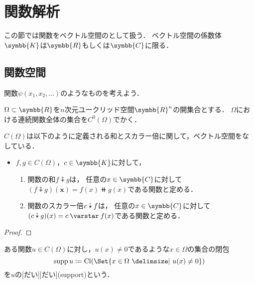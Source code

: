\documentclass[../sotsu.tex]{subfiles}
\begin{document}
\section{関数解析}

この節では関数をベクトル空間のとして扱う．
ベクトル空間の係数体$\symbb{K}$は$\symbb{R}$もしくは$\symbb{C}$に限る．

\subsection{関数空間}

関数$\psi(x_1, x_2, \dotsc)$のようなものを考えよう．

\begin{definition}
    $\Omega \subset \symbb{R}$を$n$次元ユークリッド空間$\symbb{R}^n$の開集合とする．
    $\Omega$における連続関数全体の集合を$C^0 (\Omega)$でかく．
\end{definition}

\begin{proposition}
    \label{thm:continuous-function-space-is-vector-space}
    $C(\Omega)$は以下のように定義される和とスカラー倍に関して，ベクトル空間をなしている．
    \begin{itemize}
        \item $f, g \in C(\Omega)$，$c \in \symbb{K}$に対して，
        \begin{enumerate}
            \item 関数の和$f \plushat g$は，
                任意の$x \in \symbb{C}$に対して$ ( f \plushat g )(\symbf{x}) = f(x) \doubleplus g(x) $である関数と定める．
            \item 関数のスカラー倍$c \mathbin{\hat{\mathbin{\star}}} f$は，
                任意の$x \in \symbb{C}$に対して$ ( c \mathbin{\hat{\scaprod}} g )(x) = c \scaprodvar f(x) $である関数と定める．
        \end{enumerate}
    \end{itemize}
\end{proposition}

\begin{proof}
    
\end{proof}


\begin{definition}
    ある関数$u \in C(\Omega)$に対し，$u(x) \neq 0$であるような$x \in \Omega$の集合の閉包
    \begin{equation}
        \supp u  \coloneq  \cl{ \Set{  x \in \Omega  \given  u(x) \neq 0  } }
    \end{equation}
    を$u$の[だい][だい](support)という．
\end{definition}
\end{document}
